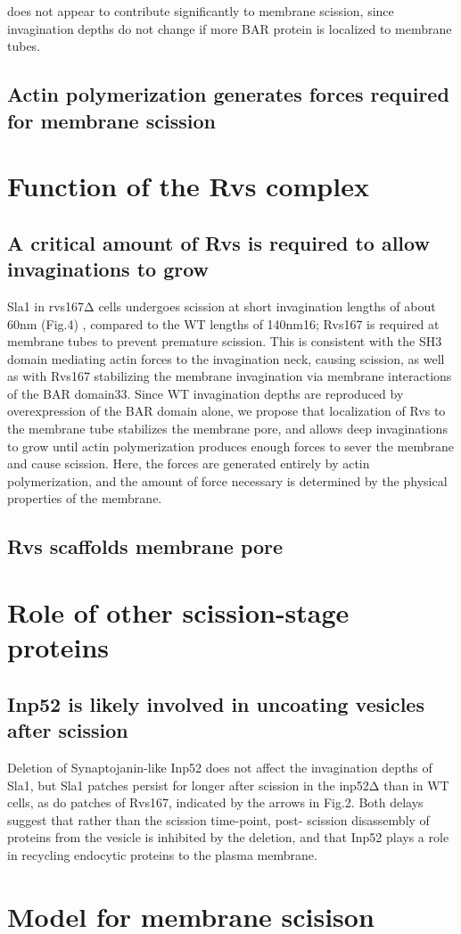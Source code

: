 does not appear to contribute significantly to membrane scission, since invagination depths do not change if more BAR protein is localized to membrane tubes. 

\subsection{ Actin polymerization generates forces required for membrane scission}

\section{Function of the Rvs complex}





\subsection{A critical amount of Rvs is required to allow invaginations to grow}

Sla1 in rvs167Δ cells undergoes scission at short invagination lengths of about 60nm (Fig.4) , compared to the WT lengths of 140nm16; Rvs167 is required at membrane tubes to prevent premature scission. This is consistent with the SH3 domain mediating actin forces to the invagination neck, causing scission, as well as with Rvs167 stabilizing the membrane invagination via membrane interactions of the BAR domain33. Since WT invagination depths are reproduced by overexpression of the BAR domain alone, we propose that localization of Rvs to the membrane tube stabilizes the membrane pore, and allows deep invaginations to grow until actin polymerization produces enough forces to sever the membrane and cause scission. Here, the forces are generated entirely by actin polymerization, and the amount of force necessary is determined by the physical properties of the membrane.

\subsection{Rvs scaffolds membrane pore}



\section{Role of other scission-stage proteins}
\subsection{Inp52 is likely involved in uncoating vesicles after scission}
Deletion of Synaptojanin-like Inp52 does not affect the invagination depths of Sla1, but Sla1 patches persist for longer after scission in the inp52Δ than in WT cells, as do patches of Rvs167, indicated by the arrows in Fig.2. Both delays suggest that rather than the scission time-point, post- scission disassembly of proteins from the vesicle is inhibited by the deletion, and that Inp52 plays a role in recycling endocytic proteins to the plasma membrane.


\section{Model for membrane scisison}



